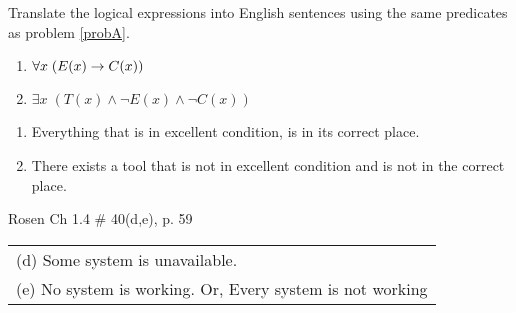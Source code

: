 \begin{questions}
 Translate the logical expressions into English sentences using the same predicates as problem \ref{probA}.
\begin{enumerate}[label=(\alph*),itemsep=0pt,parsep=0pt,
  topsep=0pt,partopsep=0pt]
    \item $\forall x\; (E(x) \rightarrow C(x))$ \hspace*{1in} %
    \item $\exists x\; (T(x) \wedge \neg E(x) \wedge \neg C(x))$ 
\end{enumerate}
  \ifprintanswers
        \vspace{-12pt}
    \fi
  \begin{solution}
  \begin{enumerate}[label=(\alph*),itemsep=0pt,parsep=0pt,
  topsep=0pt,partopsep=0pt]
      \item Everything that is in excellent condition, is in its correct place.
      \item There exists a tool that is not in excellent condition and is not in the correct place.
    \end{enumerate}
  \end{solution}




 Rosen Ch 1.4 \# 40(d,e), p. 59
    \ifprintanswers
        \vspace{-12pt}
    \fi
  \begin{solution}
      \begin{tabular}{l} 
        (d) Some system is unavailable. \\
        (e) No system is working.  Or, Every system is not working
      \end{tabular}
  \end{solution}





\end{questions}
